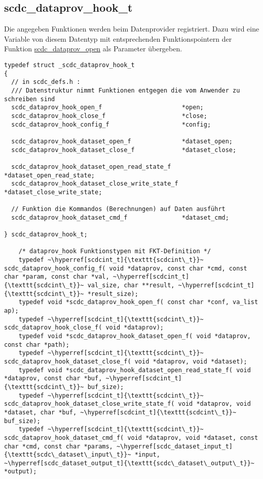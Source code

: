 \subsection{scdc\_dataprov\_hook\_t}\label{scdc_dataprov_hook_t}
Die angegeben Funktionen werden beim Datenprovider registriert. Dazu wird eine Variable von diesem Datentyp mit entsprechenden Funktionspointern der Funktion
\hyperref[scdc_dataprov_open]{scdc\_dataprov\_open} als Parameter übergeben.
\begin{minipage}{\textwidth}
\begin{lstlisting}[escapechar={~}, label={l:scdc_dataprov_hook_t}]
typedef struct _scdc_dataprov_hook_t
{
  // in scdc_defs.h :
  /// Datenstruktur nimmt Funktionen entgegen die vom Anwender zu schreiben sind
  scdc_dataprov_hook_open_f                      *open;
  scdc_dataprov_hook_close_f                     *close;
  scdc_dataprov_hook_config_f                    *config;

  scdc_dataprov_hook_dataset_open_f              *dataset_open;
  scdc_dataprov_hook_dataset_close_f             *dataset_close;

  scdc_dataprov_hook_dataset_open_read_state_f   *dataset_open_read_state;
  scdc_dataprov_hook_dataset_close_write_state_f *dataset_close_write_state;

  // Funktion die Kommandos (Berechnungen) auf Daten ausführt
  scdc_dataprov_hook_dataset_cmd_f               *dataset_cmd;

} scdc_dataprov_hook_t;

	/* dataprov_hook Funktionstypen mit FKT-Definition */
	typedef ~\hyperref[scdcint_t]{\texttt{scdcint\_t}}~ scdc_dataprov_hook_config_f( void *dataprov, const char *cmd, const char *param, const char *val, ~\hyperref[scdcint_t]{\texttt{scdcint\_t}}~ val_size, char **result, ~\hyperref[scdcint_t]{\texttt{scdcint\_t}}~ *result_size);
	typedef void *scdc_dataprov_hook_open_f( const char *conf, va_list ap);
	typedef ~\hyperref[scdcint_t]{\texttt{scdcint\_t}}~ scdc_dataprov_hook_close_f( void *dataprov);
	typedef void *scdc_dataprov_hook_dataset_open_f( void *dataprov, const char *path);
	typedef ~\hyperref[scdcint_t]{\texttt{scdcint\_t}}~ scdc_dataprov_hook_dataset_close_f( void *dataprov, void *dataset);
	typedef void *scdc_dataprov_hook_dataset_open_read_state_f( void *dataprov, const char *buf, ~\hyperref[scdcint_t]{\texttt{scdcint\_t}}~ buf_size);
	typedef ~\hyperref[scdcint_t]{\texttt{scdcint\_t}}~ scdc_dataprov_hook_dataset_close_write_state_f( void *dataprov, void *dataset, char *buf, ~\hyperref[scdcint_t]{\texttt{scdcint\_t}}~ buf_size);
	typedef ~\hyperref[scdcint_t]{\texttt{scdcint\_t}}~ scdc_dataprov_hook_dataset_cmd_f( void *dataprov, void *dataset, const char *cmd, const char *params, ~\hyperref[scdc_dataset_input_t]{\texttt{scdc\_dataset\_input\_t}}~ *input, ~\hyperref[scdc_dataset_output_t]{\texttt{scdc\_dataset\_output\_t}}~ *output);

\end{lstlisting}
\end{minipage}


